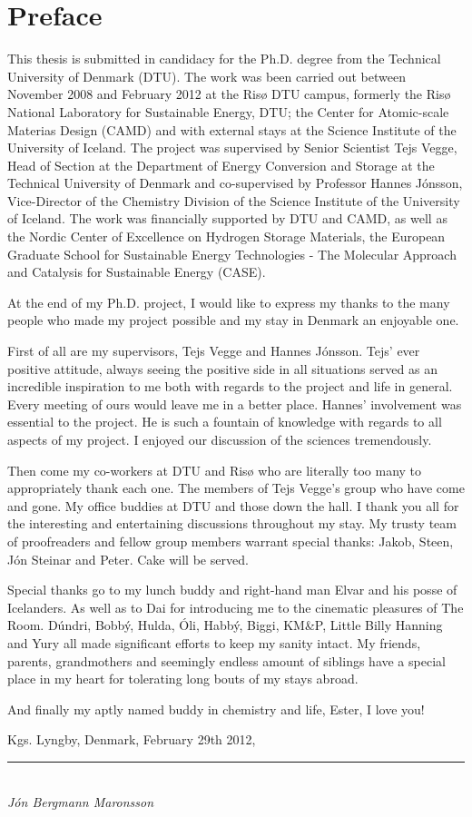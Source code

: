 \section*{Preface}

This thesis is submitted in candidacy for the Ph.D. degree from the Technical University of Denmark (DTU).
The work was been carried out between November 2008 and February 2012 at the Ris\o{} DTU campus, formerly the Ris\o{} National Laboratory for Sustainable Energy, DTU; the Center for Atomic-scale Materias Design (CAMD) and with external stays at the Science Institute of the University of Iceland.
The project was supervised by Senior Scientist Tejs Vegge, Head of Section at the Department of Energy Conversion and Storage at the Technical University of Denmark and co-supervised by Professor Hannes J\'onsson, Vice-Director of the Chemistry Division of the Science Institute of the University of Iceland.
The work was financially supported by DTU and CAMD, as well as the Nordic Center of Excellence on Hydrogen Storage Materials, the European Graduate School for Sustainable Energy Technologies - The Molecular Approach and Catalysis for Sustainable Energy (CASE).

\vspace{1em}

At the end of my Ph.D. project, I would like to express my thanks to the many people who made my project possible and my stay in Denmark an enjoyable one.

First of all are my supervisors, Tejs Vegge and Hannes J\'onsson.
Tejs' ever positive attitude, always seeing the positive side in all situations served as an incredible inspiration to me both with regards to the project and life in general.
Every meeting of ours would leave me in a better place.
Hannes' involvement was essential to the project.
He is such a fountain of knowledge with regards to all aspects of my project.
I enjoyed our discussion of the sciences tremendously.

Then come my co-workers at DTU and Ris\o{} who are literally too many to appropriately thank each one.
The members of Tejs Vegge's group who have come and gone.
My office buddies at DTU and those down the hall.
I thank you all for the interesting and entertaining discussions throughout my stay.
My trusty team of proofreaders and fellow group members warrant special thanks: Jakob, Steen, J\'on Steinar and Peter.
Cake will be served.

Special thanks go to my lunch buddy and right-hand man Elvar and his posse of Icelanders.
As well as to Da\dh{}i for introducing me to the cinematic pleasures of The Room.
D\'undri, Bobb\'y, Hulda, \'Oli, Habb\'y, Biggi, KM\&P, Little Billy Hanning and  Yury all made significant efforts to keep my sanity intact.
My friends, parents, grandmothers and seemingly endless amount of siblings have a special place in my heart for tolerating long bouts of my stays abroad.

And finally my aptly named buddy in chemistry and life, Ester, I love you!

\vspace{1em}
\begin{flushright}
Kgs. Lyngby, Denmark, February 29th 2012,\\

\vspace{2em}

\rule{50mm}{0.1pt}\\
\textit{J\'on Bergmann Maronsson}
\end{flushright}
